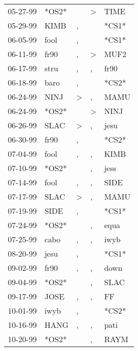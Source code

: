 \begin{supertabular}{lllll}
 05-27-99 &  *OS2* &                  &     \textgreater &   TIME \\
 05-29-99 &   KIMB &                , &                  &  *CS1* \\
 06-05-99 &   fool &                , &                  &  *CS1* \\
 06-11-99 &   fr90 &                , &     \textgreater &   MUF2 \\
 06-17-99 &   stru &                , &                , &   fr90 \\
 06-18-99 &   baro &                , &                  &  *CS2* \\
 06-24-99 &   NINJ &     \textgreater &                , &   MAMU \\
 06-24-99 &  *OS2* &                  &     \textgreater &   NINJ \\
 06-26-99 &   SLAC &     \textgreater &                , &   jesu \\
 06-30-99 &   fr90 &                , &                  &  *CS2* \\
 07-04-99 &   fool &                , &                , &   KIMB \\
 07-10-99 &  *OS2* &                  &                , &   jess \\
 07-14-99 &   fool &                , &                , &   SIDE \\
 07-17-99 &   SLAC &     \textgreater &                , &   MAMU \\
 07-19-99 &   SIDE &                , &                  &  *CS1* \\
 07-24-99 &  *OS2* &                  &                , &   equa \\
 07-25-99 &   cabo &                , &                , &   iwyb \\
 08-20-99 &   jesu &                , &                  &  *CS1* \\
 09-02-99 &   fr90 &                , &                , &   down \\
 09-04-99 &  *OS2* &                  &                , &   SLAC \\
 09-17-99 &   JOSE &                , &                , &     FF \\
 10-01-99 &   iwyb &                , &                  &  *CS2* \\
 10-16-99 &   HANG &                , &                , &   pati \\
 10-20-99 &  *OS2* &                  &                , &   RAYM \\

\end{supertabular}
